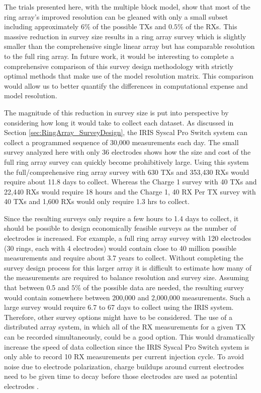 \documentclass[preprint,authoryear,12pt]{elsarticle}
\newcommand{\midtilde}{\raisebox{-0.25\baselineskip}{\textasciitilde}}
\begin{document}
The trials presented here, with the multiple block model, show that most of the ring array's improved resolution can be gleaned with only a small subset including approximately $6\%$ of the possible TXs and $0.5\%$ of the RXs. This massive reduction in survey size results in a ring array survey which is slightly smaller than the comprehensive single linear array but has comparable resolution to the full ring array. In future work, it would be interesting to complete a comprehensive comparison of this survey design methodology with strictly optimal methods that make use of the model resolution matrix. This comparison would allow us to better quantify the differences in computational expense and model resolution.

The magnitude of this reduction in survey size is put into perspective by considering how long it would take to collect each dataset. As discussed in Section \ref{sec:RingArray_SurveyDesign}, the IRIS Syscal Pro Switch system can collect a programmed sequence of \midtilde30,000 measurements each day. The small survey analyzed here with only 36 electrodes shows how the size and cost of the full ring array survey can quickly become prohibitively large. Using this system the full/comprehensive ring array survey with 630 TXs and 353,430 RXs would require about 11.8 days to collect. Whereas the Charge 1 survey with 40 TXs and 22,440 RXs would require 18 hours and the Charge 1, 40 RX Per TX survey with 40 TXs and 1,600 RXs would only require 1.3 hrs to collect.

Since the resulting surveys only require a few hours to 1.4 days to collect, it should be possible to design economically feasible surveys as the number of electrodes is increased. For example, a full ring array survey with 120 electrodes (30 rings, each with 4 electrodes) would contain close to 40 million possible measurements and require about 3.7 years to collect. Without completing the survey design process for this larger array it is difficult to estimate how many of the measurements are required to balance resolution and survey size. Assuming that between 0.5 and $5\%$ of the possible data are needed, the resulting survey would contain somewhere between 200,000 and 2,000,000 measurements. Such a large survey would require 6.7 to 67 days to collect using the IRIS system. Therefore, other survey options might have to be considered. The use of a distributed array system, in which all of the RX measurements for a given TX can be recorded simultaneously, could be a good option. This would dramatically increase the speed of data collection since the IRIS Syscal Pro Switch system is only able to record 10 RX measurements per current injection cycle. To avoid noise due to electrode polarization, charge buildups around current electrodes need to be given time to decay before those electrodes are used as potential electrodes \citep{Dahlin2000,Merriam2005,Wilkinson2012}.
\end{document}
